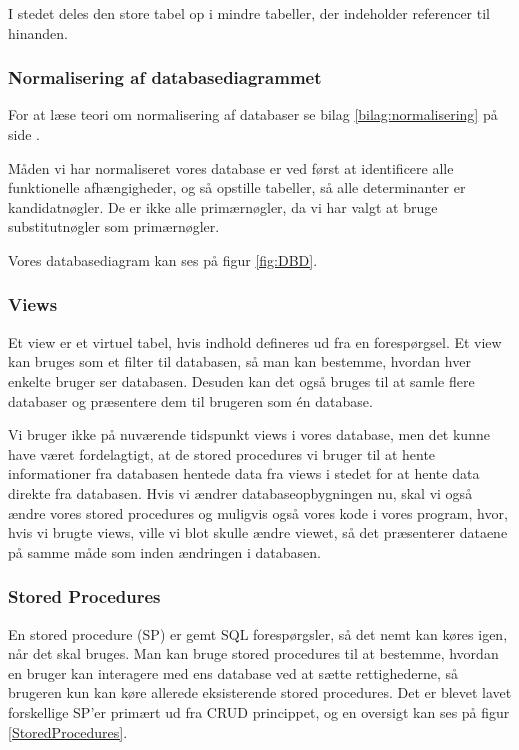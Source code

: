 I stedet deles den store tabel op i mindre tabeller, der indeholder referencer til hinanden.

\subsubsection{Normalisering af databasediagrammet}

For at læse teori om normalisering af databaser se bilag \ref{bilag:normalisering} på side \pageref{bilag:normalisering}. 

Måden vi har normaliseret vores database er ved først at identificere alle funktionelle afhængigheder, og så opstille tabeller, så alle determinanter er kandidatnøgler.
De er ikke alle primærnøgler, da vi har valgt at bruge substitutnøgler som primærnøgler.

Vores databasediagram kan ses på figur \ref{fig:DBD}.

\subsubsection{Views}

Et view er et virtuel tabel, hvis indhold defineres ud fra en forespørgsel.
Et view kan bruges som et filter til databasen, så man kan bestemme, hvordan hver enkelte bruger ser databasen.
Desuden kan det også bruges til at samle flere databaser og præsentere dem til brugeren som én database.

Vi bruger ikke på nuværende tidspunkt views i vores database, men det kunne have været fordelagtigt, at de stored procedures vi bruger til at hente informationer fra databasen hentede data fra views i stedet for at hente data direkte fra databasen.
Hvis vi ændrer databaseopbygningen nu, skal vi også ændre vores stored procedures og muligvis også vores kode i vores program, hvor, hvis vi brugte views, ville vi blot skulle ændre viewet, så det præsenterer dataene på samme måde som inden ændringen i databasen.

\subsubsection{Stored Procedures}
En stored procedure (SP) er gemt SQL forespørgsler, så det nemt kan køres igen, når det skal bruges.
Man kan bruge stored procedures til at bestemme, hvordan en bruger kan interagere med ens database ved at sætte rettighederne, så brugeren kun kan køre allerede eksisterende stored procedures.
Det er blevet lavet forskellige SP'er primært ud fra CRUD princippet, og en oversigt kan ses på figur \ref{StoredProcedures}.


